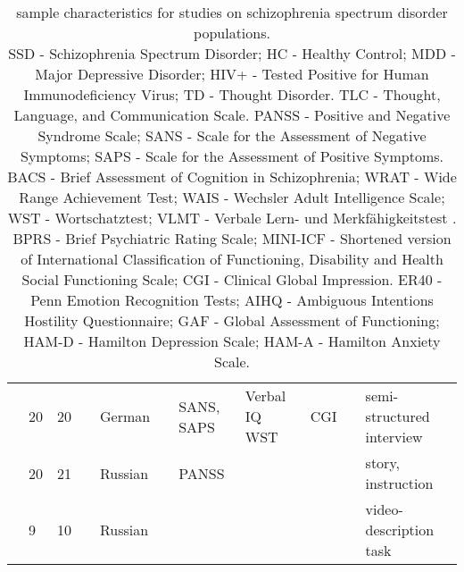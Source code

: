 \begin{sidewaystable}[]
{\begin{tabular}{lllllllllll}
\cite{just2020modeling} & 20 & 20 &  & German &  & SANS, SAPS & Verbal IQ WST & CGI &  & semi-structured interview \\
\cite{ryazanskaya2020thesis} & 20 & 21 &  & Russian &  & PANSS &  &  &  & story, instruction \\
\cite{ryazanskaya2020automated} & 9 & 10 &  & Russian &  &  &  &  &  & video-description task \\
\hline
\end{tabular}
}
\caption{\label{tab:dataset:PD} sample characteristics for studies on schizophrenia spectrum disorder populations. \\ SSD - Schizophrenia Spectrum Disorder; HC - Healthy Control; MDD - Major Depressive Disorder; HIV+ - Tested Positive for Human Immunodeficiency Virus; TD - Thought Disorder. TLC -  Thought, Language, and Communication Scale.  PANSS - Positive and Negative Syndrome Scale; SANS - Scale for the Assessment of Negative Symptoms; SAPS - Scale for the Assessment of Positive Symptoms. BACS - Brief Assessment of Cognition in Schizophrenia;  WRAT - Wide Range Achievement Test; WAIS - Wechsler Adult Intelligence Scale; WST - Wortschatztest; VLMT - Verbale Lern- und Merkfähigkeitstest . BPRS - Brief Psychiatric Rating Scale; MINI-ICF - Shortened version of International Classification of Functioning, Disability and Health Social Functioning Scale; CGI - Clinical Global Impression. ER40 - Penn Emotion Recognition Tests; AIHQ - Ambiguous Intentions Hostility Questionnaire; GAF - Global Assessment of Functioning; HAM-D - Hamilton Depression Scale; HAM-A - Hamilton Anxiety Scale.} 
\end{sidewaystable}


